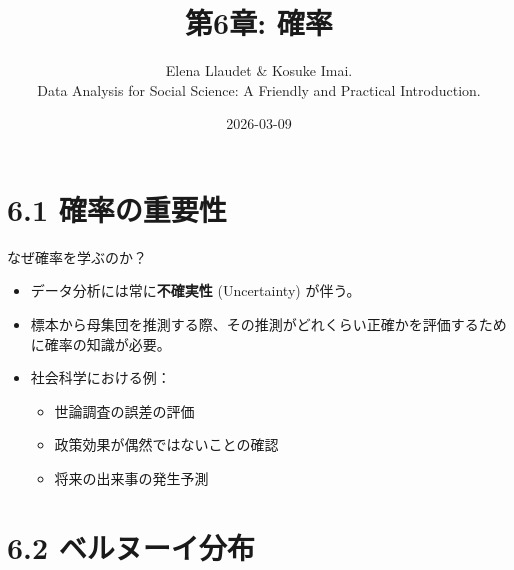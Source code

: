 \documentclass[
  ignorenonframetext,
]{beamer}
\title{第6章: 確率}
\subtitle{Elena Llaudet \& Kosuke Imai.\\
Data Analysis for Social Science: A Friendly and Practical
Introduction.}
\author{}
\date{\vspace{-2.5em}2026-03-09}
\providecommand{\tightlist}{%
  \setlength{\itemsep}{0pt}\setlength{\parskip}{0pt}}
\begin{document}
\frame{\titlepage}

\hypertarget{ux78baux7387ux306eux91cdux8981ux6027}{%
\section{6.1 確率の重要性}\label{ux78baux7387ux306eux91cdux8981ux6027}}

\begin{frame}{なぜ確率を学ぶのか？}
\protect\hypertarget{ux306aux305cux78baux7387ux3092ux5b66ux3076ux306eux304b}{}
\begin{itemize}
\tightlist
\item
  データ分析には常に\textbf{不確実性} (Uncertainty) が伴う。
\item
  標本から母集団を推測する際、その推測がどれくらい正確かを評価するために確率の知識が必要。
\item
  社会科学における例：

  \begin{itemize}
  \tightlist
  \item
    世論調査の誤差の評価
  \item
    政策効果が偶然ではないことの確認
  \item
    将来の出来事の発生予測
  \end{itemize}
\end{itemize}
\end{frame}

\hypertarget{ux30d9ux30ebux30ccux30fcux30a4ux5206ux5e03}{%
\section{6.2
ベルヌーイ分布}\label{ux30d9ux30ebux30ccux30fcux30a4ux5206ux5e03}}
\end{document}
